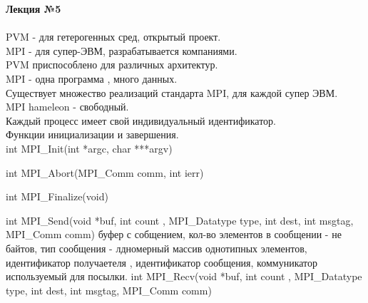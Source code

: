 

\LARGE{ \textbf {Лекция №5}}\\
\Large{ \textbf {}}\\
PVM - для гетерогенных сред, открытый проект.\\
MPI - для супер-ЭВМ, разрабатывается компаниями.\\
PVM  приспособлено для различных архитектур.\\
MPI - одна программа , много данных.\\
Существует множество реализаций стандарта MPI, для каждой супер ЭВМ. \\
MPI hameleon - свободный.\\
Каждый процесс имеет свой индивидуальный идентификатор. \\


Функции инициализации и завершения.\\

int MPI_Init(int *argc, char ***argv)

int MPI_Abort(MPI_Comm comm, int ierr)

int MPI_Finalize(void)

int MPI_Send(void *buf, int count , MPI_Datatype type, int dest, int msgtag, MPI_Comm comm)
буфер с собщением, кол-во элементов в сообщении - не байтов, тип сообщения - лдномерный массив однотипных элементов, идентификатор получаетеля
, идентификатор сообщения, коммуникатор используемый для посылки.
int MPI_Recv(void *buf, int count , MPI_Datatype type, int dest, int msgtag, MPI_Comm comm)




